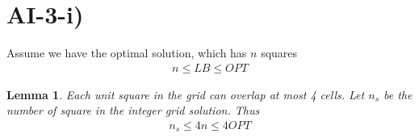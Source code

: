 \section*{AI-3-i)}
\label{approx-1-3-i}
\newtheorem{lem}[]{Lemma}

Assume we have the optimal solution, which has $n$ squares
\begin{align*}
    n \le LB \le OPT
\end{align*}

\begin{lem}
    Each unit square in the grid can overlap at most 4 cells.
Let $n_s$ be the number of square in the integer grid solution. Thus
    \begin{align*}
        n_s \le 4n \le 4OPT
    \end{align*}
\end{lem}
